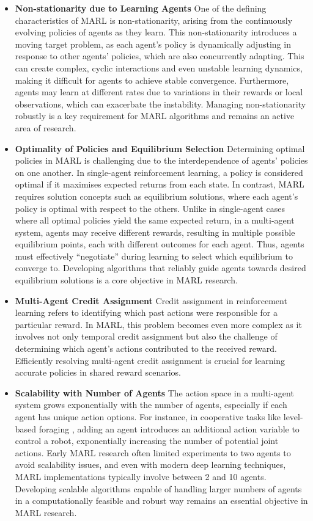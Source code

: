 \documentclass{article}
\begin{document}
\begin{itemize}
    \item \textbf{Non-stationarity due to Learning Agents} One of the defining characteristics of MARL is non-stationarity, arising from the continuously evolving policies of agents as they learn. This non-stationarity introduces a moving target problem, as each agent’s policy is dynamically adjusting in response to other agents’ policies, which are also concurrently adapting. This can create complex, cyclic interactions and even unstable learning dynamics, making it difficult for agents to achieve stable convergence. Furthermore, agents may learn at different rates due to variations in their rewards or local observations, which can exacerbate the instability. Managing non-stationarity robustly is a key requirement for MARL algorithms and remains an active area of research.
    \item \textbf{Optimality of Policies and Equilibrium Selection} Determining optimal policies in MARL is challenging due to the interdependence of agents' policies on one another. In single-agent reinforcement learning, a policy is considered optimal if it maximises expected returns from each state. In contrast, MARL requires solution concepts such as equilibrium solutions, where each agent’s policy is optimal with respect to the others. Unlike in single-agent cases where all optimal policies yield the same expected return, in a multi-agent system, agents may receive different rewards, resulting in multiple possible equilibrium points, each with different outcomes for each agent. Thus, agents must effectively ``negotiate'' during learning to select which equilibrium to converge to. Developing algorithms that reliably guide agents towards desired equilibrium solutions is a core objective in MARL research.
    \item \textbf{Multi-Agent Credit Assignment} Credit assignment in reinforcement learning refers to identifying which past actions were responsible for a particular reward. In MARL, this problem becomes even more complex as it involves not only temporal credit assignment but also the challenge of determining which agent’s actions contributed to the received reward. Efficiently resolving multi-agent credit assignment is crucial for learning accurate policies in shared reward scenarios.
    \item \textbf{Scalability with Number of Agents} The action space in a multi-agent system grows exponentially with the number of agents, especially if each agent has unique action options. For instance, in cooperative tasks like level-based foraging \citep{papoudakis2021benchmarking}, adding an agent introduces an additional action variable to control a robot, exponentially increasing the number of potential joint actions. Early MARL research often limited experiments to two agents to avoid scalability issues, and even with modern deep learning techniques, MARL implementations typically involve between 2 and 10 agents. \citep{albrecht2024marl} Developing scalable algorithms capable of handling larger numbers of agents in a computationally feasible and robust way remains an essential objective in MARL research.
\end{itemize}
\end{document}
